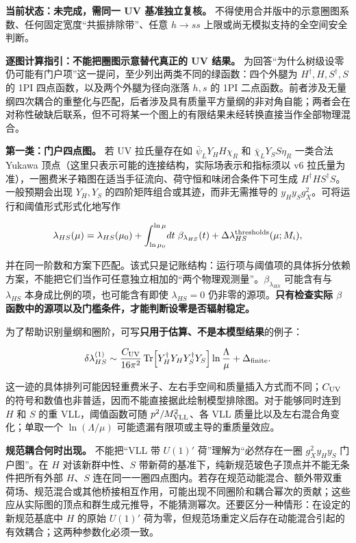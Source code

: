 \documentclass[
]{article}
\begin{document}
\textbf{当前状态：未完成，需同一 UV 基准独立复核。}
不得使用合并版中的示意圈图系数、任何固定宽度``共振排除带''、任意
\(h\to ss\) 上限或尚无模拟支持的全空间安全判断。

\textbf{逐图计算指引：不能把圈图示意替代真正的 UV 结果。}
为回答``为什么树级设零仍可能有门户项''这一提问，至少列出两类不同的绿函数：四个外腿为
\(H^\dagger,H,S^\dagger,S\) 的 1PI 四点函数，以及两个外腿为径向涨落
\(h,s\) 的 1PI
二点函数。前者涉及无量纲四次耦合的重整化与匹配，后者涉及具有质量平方量纲的非对角自能；两者会在对称性破缺后联系，但不可将某一个图上的有限结果未经转换直接当作全部物理混合。

\textbf{第一类：门户四点图。} 若 UV 拉氏量存在如
\(\bar\psi_L Y_H H\chi_R\) 和 \(\bar\chi_LY_S S\eta_R\) 一类合法 Yukawa
顶点（这里只表示可能的连接结构，实际场表示和指标须以 v6
拉氏量为准），一圈费米子箱图在适当手征流向、荷守恒和味闭合条件下可生成
\(H^\dagger H S^\dagger S\)。一般预期会出现 \(Y_H,Y_S\)
的四阶矩阵组合或其迹，而非无需推导的
\(y_Hy_Sg_X^2\)。可将运行和阈值形式形式化地写作

\[
\lambda_{HS}(\mu)=\lambda_{HS}(\mu_0)
+\int_{\ln\mu_0}^{\ln\mu}\!dt\;\beta_{\lambda_{HS}}(t)
+\Delta\lambda_{HS}^{\rm thresholds}(\mu;M_i),
\]

并在同一阶数和方案下匹配。该式只是记账结构：运行项与阈值项的具体拆分依赖方案，不能把它们当作可任意独立相加的``两个物理观测量''。\(\beta_{\lambda_{HS}}\)
可能含有与 \(\lambda_{HS}\) 本身成比例的项，也可能含有即使
\(\lambda_{HS}=0\) 仍非零的源项。\textbf{只有检查实际 \(\beta\)
函数中的源项以及门槛条件，才能判断设零是否辐射稳定。}

为了帮助识别量纲和圈阶，可写\textbf{只用于估算、不是本模型结果}的例子：

\[
\delta\lambda_{HS}^{(1)}\sim
\frac{C_{\rm UV}}{16\pi^2}\,
\mathrm{Tr}\!\left[ Y_H^\dagger Y_H Y_S^\dagger Y_S\right]
\ln\frac{\Lambda}{\mu}
+\Delta_{\rm finite}.
\]

这一迹的具体排列可能因轻重费米子、左右手空间和质量插入方式而不同；\(C_{\rm UV}\)
的符号和数值也非普适，因而不能直接据此绘制模型排除图。对于能够同时连到
\(H\) 和 \(S\) 的重 VLL，阈值函数可随 \(p^2/M_{\rm VLL}^2\)、各 VLL
质量比以及左右混合角变化；单取一个 \(\ln(\Lambda/\mu)\)
可能遗漏有限项或主导的重质量效应。

\textbf{规范耦合何时出现。} 不能把``VLL 带 \(U(1)'\)
荷''理解为``必然存在一圈 \(g_X^2y_Hy_S\) 门户图''。在 \(H\)
对该新群中性、\(S\)
带新荷的基准下，纯新规范玻色子顶点并不能无条件把所有外部 \(H\)、\(S\)
连在同一一圈四点图内。若存在规范动能混合、额外带双重荷场、规范混合或其他桥接相互作用，可能出现不同圈阶和耦合幂次的贡献；这些应从实际图的顶点和群生成元推导，不能猜测幂次。还要区分一种情形：在设定的新规范基底中
\(H\) 的原始 \(U(1)'\)
荷为零，但规范场重定义后存在动能混合引起的有效耦合；这两种参数化必须一致。
\end{document}
